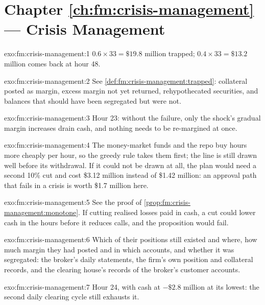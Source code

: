\section*{Chapter \ref{ch:fm:crisis-management} --- Crisis Management}

\begin{solution}{exo:fm:crisis-management:1}
$0.6\times33=\$19.8$ million trapped; $0.4\times33=\$13.2$ million comes back at hour 48.
\end{solution}

\begin{solution}{exo:fm:crisis-management:2}
See \cref{def:fm:crisis-management:trapped}: collateral posted as margin, excess margin not yet returned, rehypothecated securities, and balances that
should have been segregated but were not.
\end{solution}

\begin{solution}{exo:fm:crisis-management:3}
Hour 23: without the failure, only the shock's gradual margin increases drain cash, and nothing needs to be re-margined at once.
\end{solution}

\begin{solution}{exo:fm:crisis-management:4}
The money-market funds and the repo buy hours more cheaply per hour, so the greedy rule takes them first; the line is still drawn well before its
withdrawal. If it could not be drawn at all, the plan would need a second 10\% cut and cost \$3.12 million instead of \$1.42 million: an approval path
that fails in a crisis is worth \$1.7 million here.
\end{solution}

\begin{solution}{exo:fm:crisis-management:5}
See the proof of \cref{prop:fm:crisis-management:monotone}. If cutting realised losses paid in cash, a cut could lower cash in the hours before it
reduces calls, and the proposition would fail.
\end{solution}

\begin{solution}{exo:fm:crisis-management:6}
Which of their positions still existed and where, how much margin they had posted and in which accounts, and whether it was segregated: the
broker's daily statements, the firm's own position and collateral records, and the clearing house's records of the broker's customer accounts.
\end{solution}

\begin{solution}{exo:fm:crisis-management:7}
Hour 24, with cash at $-\$2.8$ million at its lowest: the second daily clearing cycle still exhausts it.
\end{solution}

